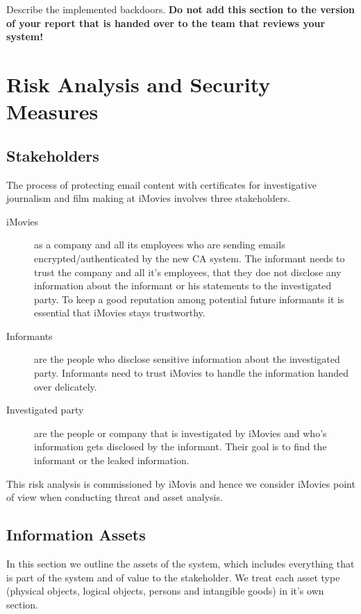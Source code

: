 \documentclass[a4paper, toc=index, 12pt, DIV14, twoside, BCOR2cm, headsepline, numbers=noenddot, bibliography=totoc]{scrbook}
\begin{document}
Describe the implemented backdoors. {\bfseries Do not add
    this section to the version of your report that is handed over to
    the team that reviews your system!}

\chapter{Risk Analysis and Security Measures}
\section{Stakeholders}
The process of protecting email content with certificates for investigative journalism and film making at iMovies involves three stakeholders.
\begin{description}
\item[iMovies] as a company and all its employees who are sending emails encrypted/authenticated by the new CA system. The informant needs to trust the company and all it's employees, that they doe not disclose any information about the informant or his statements to the investigated party. To keep a good reputation among potential future informants it is essential that iMovies stays trustworthy.
\item[Informants] are the people who disclose sensitive information about the investigated party. Informants need to trust iMovies to handle the information handed over delicately.
\item[Investigated party] are the people or company that is investigated by iMovies and who's information gets disclosed by the informant. Their goal is to find the informant or the leaked information.
\end{description}
This risk analysis is commissioned by iMovis and hence we consider iMovies point of view when conducting threat and asset analysis.

\section{Information Assets}
In this section we outline the assets of the system, which includes everything that is part of the system and of value to the stakeholder. We treat each asset type (physical objects, logical objects, persons and intangible goods) in it's own section.
\end{document}
